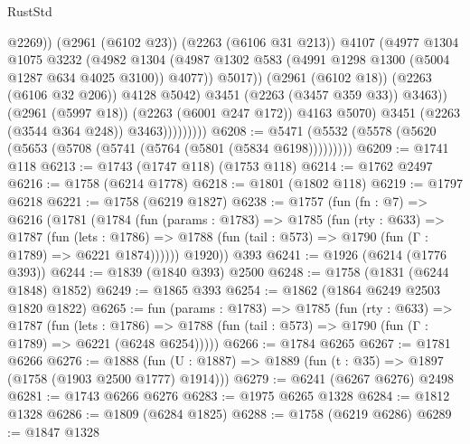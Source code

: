 \begin{lexlean}{RustStd}
\begin{coremodule}
                                    @2269))
                                (@2961 (@6102 @23))
                                (@2263 (@6106 @31 @213))
                                @4107
                                (@4977
                                  @1304
                                  @1075
                                  @3232
                                  (@4982
                                    @1304
                                    (@4987
                                      @1302
                                      @583
                                      (@4991 @1298 @1300 (@5004 @1287 @634 @4025 @3100))
                                      @4077))
                                  @5017))
                              (@2961 (@6102 @18))
                              (@2263 (@6106 @32 @206))
                              @4128
                              @5042)
                            @3451
                            (@2263 (@3457 @359 @33))
                            @3463))
                        (@2961 (@5997 @18))
                        (@2263 (@6001 @247 @172))
                        @4163
                        @5070)
                      @3451
                      (@2263 (@3544 @364 @248))
                      @3463)))))))))
@6208 := @5471 (@5532 (@5578 (@5620 (@5653 (@5708 (@5741 (@5764 (@5801 (@5834 @6198)))))))))
@6209 := @1741 @118
@6213 := @1743 (@1747 @118) (@1753 @118)
@6214 := @1762 @2497
@6216 := @1758 (@6214 @1778)
@6218 := @1801 (@1802 @118)
@6219 := @1797 @6218
@6221 := @1758 (@6219 @1827)
@6238 := @1757
    (fun (fn : @7) =>
    @6216
      (@1781
        (@1784
          (fun (params : @1783) =>
          @1785
            (fun (rty : @633) =>
            @1787
              (fun (lets : @1786) =>
              @1788 (fun (tail : @573) => @1790 (fun (Γ : @1789) => @6221 @1874))))))
        @1920))
    @393
@6241 := @1926 (@6214 (@1776 @393))
@6244 := @1839 (@1840 @393) @2500
@6248 := @1758 (@1831 (@6244 @1848) @1852)
@6249 := @1865 @393
@6254 := @1862 (@1864 @6249 @2503 @1820 @1822)
@6265 := fun (params : @1783) =>
  @1785
    (fun (rty : @633) =>
    @1787
      (fun (lets : @1786) =>
      @1788 (fun (tail : @573) => @1790 (fun (Γ : @1789) => @6221 (@6248 @6254)))))
@6266 := @1784 @6265
@6267 := @1781 @6266
@6276 := @1888 (fun (U : @1887) => @1889 (fun (t : @35) => @1897 (@1758 (@1903 @2500 @1777) @1914)))
@6279 := @6241 (@6267 @6276) @2498
@6281 := @1743 @6266 @6276
@6283 := @1975 @6265 @1328
@6284 := @1812 @1328
@6286 := @1809 (@6284 @1825)
@6288 := @1758 (@6219 @6286)
@6289 := @1847 @1328

\end{coremodule}
\end{lexlean}
